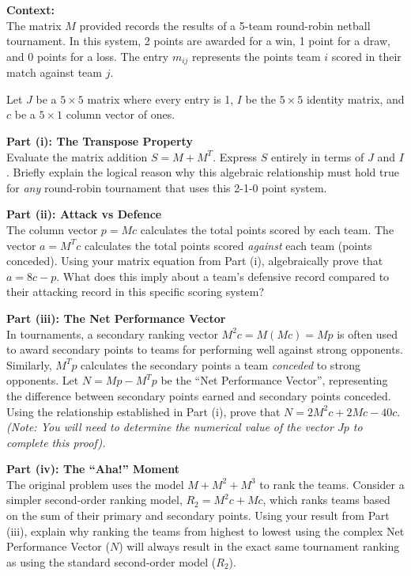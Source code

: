 \begin{problem}
\textbf{Context:}\\
The matrix $M$ provided records the results of a 5-team round-robin netball tournament. In this system, 2 points are awarded for a win, 1 point for a draw, and 0 points for a loss. The entry $m_{ij}$ represents the points team $i$ scored in their match against team $j$. 

Let $J$ be a $5 \times 5$ matrix where every entry is 1, $I$ be the $5 \times 5$ identity matrix, and $c$ be a $5 \times 1$ column vector of ones. 

\textbf{Part (i): The Transpose Property}\\
Evaluate the matrix addition $S = M + M^T$. Express $S$ entirely in terms of $J$ and $I$. Briefly explain the logical reason why this algebraic relationship must hold true for \textit{any} round-robin tournament that uses this 2-1-0 point system.

\textbf{Part (ii): Attack vs Defence}\\
The column vector $p = Mc$ calculates the total points scored by each team. The vector $a = M^Tc$ calculates the total points scored \textit{against} each team (points conceded). Using your matrix equation from Part (i), algebraically prove that $a = 8c - p$. What does this imply about a team's defensive record compared to their attacking record in this specific scoring system?

\textbf{Part (iii): The Net Performance Vector}\\
In tournaments, a secondary ranking vector $M^2 c = M(Mc) = Mp$ is often used to award secondary points to teams for performing well against strong opponents. Similarly, $M^Tp$ calculates the secondary points a team \textit{conceded} to strong opponents. 
Let $N = Mp - M^Tp$ be the ``Net Performance Vector'', representing the difference between secondary points earned and secondary points conceded. 
Using the relationship established in Part (i), prove that $N = 2M^2c + 2Mc - 40c$. 
\textit{(Note: You will need to determine the numerical value of the vector $Jp$ to complete this proof).}

\textbf{Part (iv): The ``Aha!'' Moment}\\
The original problem uses the model $M + M^2 + M^3$ to rank the teams. Consider a simpler second-order ranking model, $R_2 = M^2 c + Mc$, which ranks teams based on the sum of their primary and secondary points. 
Using your result from Part (iii), explain why ranking the teams from highest to lowest using the complex Net Performance Vector ($N$) will always result in the exact same tournament ranking as using the standard second-order model ($R_2$). 
\end{problem}

